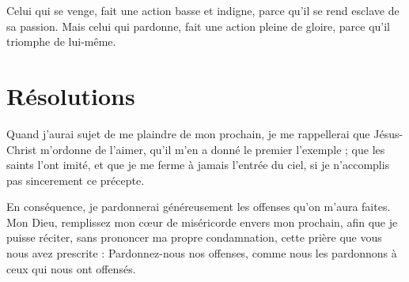 \documentclass[instructions.tex]{subfiles}
\begin{document}
Celui qui se venge, fait une action basse et indigne, parce qu’il se rend esclave de sa passion. Mais celui qui pardonne, fait une action pleine de gloire, parce qu’il triomphe de lui-même.
 
\section{Résolutions}
 
\primo Quand j’aurai sujet de me plaindre de mon prochain, je me rappellerai que Jésus-Christ m’ordonne de l’aimer, qu’il m’en a donné le premier l’exemple ; que les saints l’ont imité, et que je me ferme à jamais l’entrée du ciel, si je n’accomplis pas sincerement ce précepte.
 
\secundo En conséquence, je pardonnerai généreusement les offenses qu’on m’aura faites. Mon Dieu, remplissez mon cœur de miséricorde envers mon prochain, afin que je puisse réciter, sans prononcer ma propre condamnation, cette prière que vous nous avez prescrite : Pardonnez-nous nos offenses, comme nous les pardonnons à ceux qui nous ont offensés.
 
\end{document}
